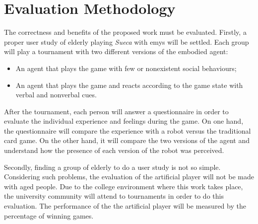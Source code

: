 \section{Evaluation Methodology} \label{sec:evaluation}

The correctness and benefits of the proposed work must be evaluated.
Firstly, a proper user study of elderly playing \emph{Sueca} with \gls{emys} will be settled.
Each group will play a tournament with two different versions of the embodied agent:
\begin{itemize}
\item An agent that plays the game with few or nonexistent social behaviours;
\item An agent that plays the game and reacts according to the game state with verbal and nonverbal cues.
\end{itemize}
After the tournament, each person will answer a questionnaire in order to evaluate the individual experience and feelings during the game.
On one hand, the questionnaire will compare the experience with a robot versus the traditional card game.
On the other hand, it will compare the two versions of the agent and understand how the presence of each version of the robot was perceived.

Secondly, finding a group of elderly to do a user study is not so simple.
Considering such problems, the evaluation of the artificial player will not be made with aged people.
Due to the college environment where this work takes place, the university community will attend to tournaments in order to do this evaluation.
The performance of the the artificial player will be measured by the percentage of winning games.